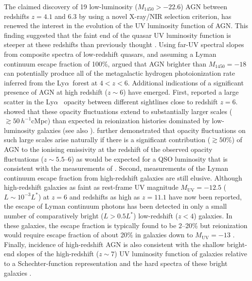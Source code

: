 \documentclass[a4paper,fleqn,usenatbib]{mnras}
\def\lya{Ly$\alpha$~}
\begin{document}
The claimed discovery of 19 low-luminosity ($M_{1450}>-22.6$) AGN
between redshifts $z=4.1$ and $6.3$ by \citet{2015AA...578A..83G}
using a novel X-ray/NIR selection criterion, has renewed the interest
in the evolution of the UV luminosity function of AGN.  This finding
suggested that the faint end of the quasar UV luminosity function is
steeper at these redshifts than previously thought
\citep{2007ApJ...654..731H, 2012ApJ...746..125H}.  Using far-UV
spectral slopes from composite spectra of low-redshift quasars, and
assuming a Lyman continuum escape fraction of 100\%,
\citet{2015AA...578A..83G} argued that AGN brighter than
$M_{1450}=-18$ can potentially produce all of the metagalactic
hydrogen photoionization rate inferred from the \lya forest at
$4<z<6$.  Additional indications of a significant presence of AGN at
high redshift ($z\sim 6$) have emerged.  First,
\citet{2015MNRAS.447.3402B} reported a large scatter in the \lya
opacity between different sightlines close to redshift
$z=6$. \cite{2015MNRAS.453.2943C} showed that these opacity
fluctuations extend to substantially larger scales ($\gtrsim 50\,
h^{-1}$cMpc) than expected in reionization histories dominated by
low-luminosity galaxies (see also \citealt{2016MNRAS.460.1328D}).
\citet{2017MNRAS.465.3429C} further demonstrated that opacity
fluctuations on such large scales arise naturally if there is a
significant contribution ($\gtrsim 50\%$) of AGN to the ionising
emissivity at the redshift of the observed opacity fluctuations ($z
\sim 5.5$--$6$) as would be expected for a QSO luminosity that is
consistent with the measurements of \citet{2015AA...578A..83G}.
Second, measurements of the Lyman continuum escape fraction from
high-redshift galaxies are still elusive.  Although high-redshift
galaxies as faint as rest-frame UV magnitude $M_\mathrm{UV}=-12.5$
($L\sim 10^{-3}L^*$) at $z=6$ \citep{2017ApJ...835..113L} and
redshifts as high as $z=11.1$ \citep{2016ApJ...819..129O} have now
been reported, the escape of Lyman continuum photons has been detected
in only a small number of comparatively bright ($L>0.5L^*$)
low-redshift ($z < 4$) galaxies.  In these galaxies, the escape
fraction is typically found to be 2--20\% \citep{2010ApJ...725.1011V,
  2011ApJ...736...41B, 2015ApJ...804...17S, 2015ApJ...810..107M,
  2016A&A...585A..48G, 2017MNRAS.468..389J, 2017MNRAS.465..316M} but
reionization would require escape fraction of about 20\% in galaxies
down to $M_\mathrm{UV}=-13$ \citep{2016PASA...33...37F,
  2015ApJ...802L..19R, 2016MNRAS.457.4051K}.  Finally, incidence of
high-redshift AGN is also consistent with the shallow bright-end
slopes of the high-redshift ($z\sim 7$) UV luminosity function of
galaxies relative to a Schechter-function representation
\citep{2012MNRAS.426.2772B, 2014MNRAS.440.2810B, 2014ApJ...792...76B,
  2015MNRAS.452.1817B} and the hard spectra of these bright galaxies
\citep{2015MNRAS.450.1846S, 2015MNRAS.454.1393S, 2017MNRAS.464..469S}.
\end{document}
